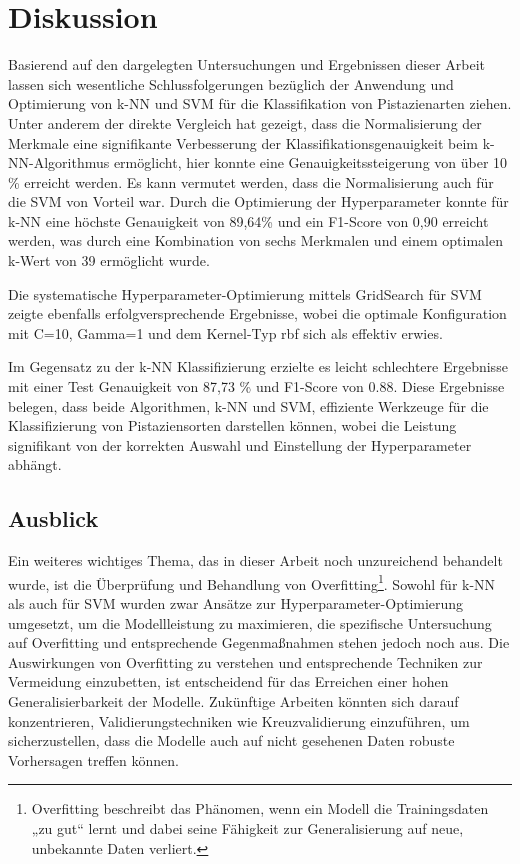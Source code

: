 \section{Diskussion}

Basierend auf den dargelegten Untersuchungen und Ergebnissen dieser Arbeit lassen sich wesentliche Schlussfolgerungen bezüglich der Anwendung und Optimierung von k-NN und SVM für die Klassifikation von Pistazienarten ziehen. Unter anderem der direkte Vergleich hat gezeigt, dass die Normalisierung der Merkmale eine signifikante Verbesserung der Klassifikationsgenauigkeit beim k-NN-Algorithmus ermöglicht, hier konnte eine Genauigkeitssteigerung von über 10 \% erreicht werden. Es kann vermutet werden, dass die Normalisierung auch für die SVM von Vorteil war. Durch die Optimierung der Hyperparameter konnte für k-NN eine höchste Genauigkeit von 89,64\% und ein F1-Score von 0,90 erreicht werden, was durch eine Kombination von sechs Merkmalen und einem optimalen \glqq{}k\grqq{}-Wert von 39 ermöglicht wurde.

Die systematische Hyperparameter-Optimierung mittels \glqq{}GridSearch\grqq{} für SVM zeigte ebenfalls erfolgversprechende Ergebnisse, wobei die optimale Konfiguration mit C=10, Gamma=1 und dem Kernel-Typ \glqq{}rbf\grqq{} sich als effektiv erwies. 

Im Gegensatz zu der k-NN Klassifizierung erzielte es leicht schlechtere Ergebnisse mit einer Test Genauigkeit von 87,73 \% und F1-Score von 0.88.
Diese Ergebnisse belegen, dass beide Algorithmen, k-NN und SVM, effiziente Werkzeuge für die Klassifizierung von Pistaziensorten darstellen können, wobei die Leistung signifikant von der korrekten Auswahl und Einstellung der Hyperparameter abhängt.

\subsection{Ausblick}
Ein weiteres wichtiges Thema, das in dieser Arbeit noch unzureichend behandelt wurde, ist die Überprüfung und Behandlung von Overfitting\footnote{Overfitting beschreibt das Phänomen, wenn ein Modell die Trainingsdaten „zu gut“ lernt und dabei seine Fähigkeit zur Generalisierung auf neue, unbekannte Daten verliert.}.  Sowohl für k-NN als auch für SVM wurden zwar Ansätze zur Hyperparameter-Optimierung umgesetzt, um die Modellleistung zu maximieren, die spezifische Untersuchung auf Overfitting und entsprechende Gegenmaßnahmen stehen jedoch noch aus. Die Auswirkungen von Overfitting zu verstehen und entsprechende Techniken zur Vermeidung einzubetten, ist entscheidend für das Erreichen einer hohen Generalisierbarkeit der Modelle. Zukünftige Arbeiten könnten sich darauf konzentrieren, Validierungstechniken wie Kreuzvalidierung einzuführen, um sicherzustellen, dass die Modelle auch auf nicht gesehenen Daten robuste Vorhersagen treffen können.